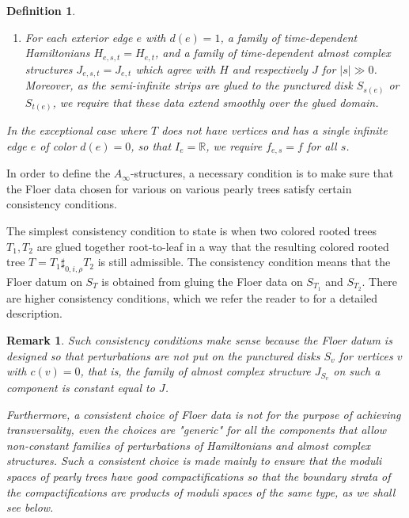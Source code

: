 \documentclass{amsart}
\newtheorem{definition}[theorem]{Definition}
\newtheorem{remark}[theorem]{Remark}
\numberwithin{equation}{section}
\numberwithin{figure}{section}
\begin{document}
\begin{definition}
\begin{enumerate}[label=(\roman*)]
\item For each exterior edge $e$ with $d(e) = 1$, a family of time-dependent Hamiltonians $H_{e, s, t} = H_{e, t}$, and a family of time-dependent almost complex structures $J_{e, s, t} = J_{e, t}$ which agree with $H$ and respectively $J$ for $|s| \gg 0$. Moreover, as the semi-infinite strips are glued to the punctured disk $S_{s(e)}$ or $S_{t(e)}$, we require that these data extend smoothly over the glued domain.

\end{enumerate}

	In the exceptional case where $T$ does not have vertices and has a single infinite edge $e$ of color $d(e) = 0$, so that $I_{e} = \mathbb{R}$, we require $f_{e, s} = f$ for all $s$.

\end{definition}

	In order to define the $A_{\infty}$-structures, a necessary condition is to make sure that the Floer data chosen for various on various pearly trees satisfy certain consistency conditions. \par
	The simplest consistency condition to state is when two colored rooted trees $T_{1}, T_{2}$ are glued together root-to-leaf in a way that the resulting colored rooted tree $T = T_{1} \sharp_{0, i, \rho} T_{2}$ is still admissible. The consistency condition means that the Floer datum on $S_{T}$ is obtained from gluing the Floer data on $S_{T_{1}}$ and $S_{T_{2}}$. There are higher consistency conditions, which we refer the reader to \cite{Seidel} for a detailed description. \par


\begin{remark}
	Such consistency conditions make sense because the Floer datum is designed so that perturbations are not put on the punctured disks $S_{v}$ for vertices $v$ with $c(v) = 0$, that is, the family of almost complex structure $J_{S_{v}}$ on such a component is constant equal to $J$. \par
	Furthermore, a consistent choice of Floer data is not for the purpose of achieving transversality, even the choices are "generic" for all the components that allow non-constant families of perturbations of Hamiltonians and almost complex structures. Such a consistent choice is made mainly to ensure that the moduli spaces of pearly trees have good compactifications so that the boundary strata of the compactifications are products of moduli spaces of the same type, as we shall see below.
\end{remark}
\end{document}
